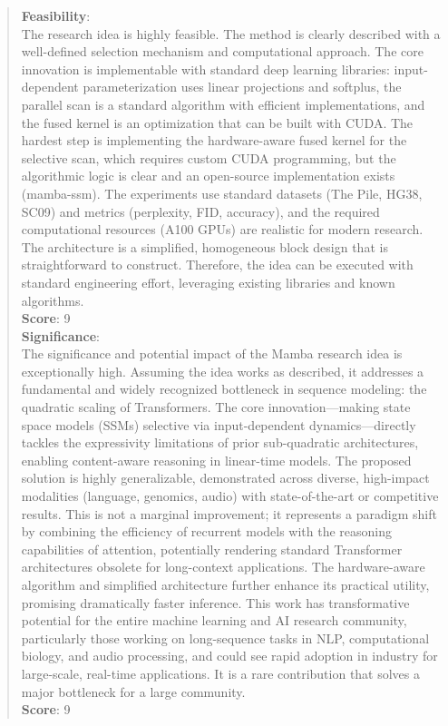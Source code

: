 \begin{quote}
\begin{tcolorbox}[breakable,colback=almond!20!white, colframe=almond!60!black, title=\textbf{Case Study (Mamba: Linear-Time Sequence Modeling with Selective State Spaces)}]
        \textbf{Feasibility}:\\
        The research idea is highly feasible. The method is clearly described with a well-defined selection mechanism and computational approach. The core innovation is implementable with standard deep learning libraries: input-dependent parameterization uses linear projections and softplus, the parallel scan is a standard algorithm with efficient implementations, and the fused kernel is an optimization that can be built with CUDA. The hardest step is implementing the hardware-aware fused kernel for the selective scan, which requires custom CUDA programming, but the algorithmic logic is clear and an open-source implementation exists (mamba-ssm). The experiments use standard datasets (The Pile, HG38, SC09) and metrics (perplexity, FID, accuracy), and the required computational resources (A100 GPUs) are realistic for modern research. The architecture is a simplified, homogeneous block design that is straightforward to construct. Therefore, the idea can be executed with standard engineering effort, leveraging existing libraries and known algorithms.\\
        \textbf{Score}: 9\\

        \textbf{Significance}:\\
        The significance and potential impact of the Mamba research idea is exceptionally high. Assuming the idea works as described, it addresses a fundamental and widely recognized bottleneck in sequence modeling: the quadratic scaling of Transformers. The core innovation—making state space models (SSMs) selective via input-dependent dynamics—directly tackles the expressivity limitations of prior sub-quadratic architectures, enabling content-aware reasoning in linear-time models. The proposed solution is highly generalizable, demonstrated across diverse, high-impact modalities (language, genomics, audio) with state-of-the-art or competitive results. This is not a marginal improvement; it represents a paradigm shift by combining the efficiency of recurrent models with the reasoning capabilities of attention, potentially rendering standard Transformer architectures obsolete for long-context applications. The hardware-aware algorithm and simplified architecture further enhance its practical utility, promising dramatically faster inference. This work has transformative potential for the entire machine learning and AI research community, particularly those working on long-sequence tasks in NLP, computational biology, and audio processing, and could see rapid adoption in industry for large-scale, real-time applications. It is a rare contribution that solves a major bottleneck for a large community.\\
        \textbf{Score}: 9\\


\end{tcolorbox}
\end{quote}
